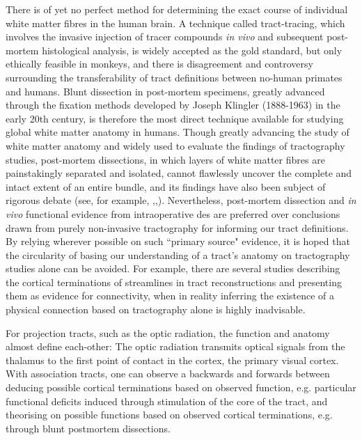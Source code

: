 There is of yet no perfect method for determining the exact course of individual white matter fibres in the human brain.
A technique called tract-tracing, which involves the invasive injection of tracer compounds \textit{in vivo} and subsequent post-mortem histological analysis, is widely accepted as the gold standard, but only ethically feasible in monkeys, and there is disagreement and controversy surrounding the transferability of tract definitions between no-human primates and humans.\autocite{Becker2022,ThiebautdeSchotten2012}
Blunt dissection in post-mortem specimens, greatly advanced through the fixation methods developed by Joseph Klingler (1888-1963) in the early 20th century,\autocite{Agrawal2011} is therefore the most direct technique available for studying global white matter anatomy in humans.
Though greatly advancing the study of white matter anatomy and widely used to evaluate the findings of tractography studies, post-mortem dissections, in which layers of white matter fibres are painstakingly separated and isolated, cannot flawlessly uncover the complete and intact extent of an entire bundle,\autocite{Martino2010, Dick2012} and its findings have also been subject of rigorous debate (see, for example, \textcite{Giampiccolo2022a},\textcite{Becker2022},\textcite{Giampiccolo2022b}).
Nevertheless, post-mortem dissection and \textit{in vivo} functional evidence from intraoperative \gls{des} are preferred over conclusions drawn from purely non-invasive tractography for informing our tract definitions.
By relying wherever possible on such ``primary source" evidence, it is hoped that the circularity of basing our understanding of a tract's anatomy on tractography studies alone can be avoided. %
For example, there are several studies describing the cortical terminations of streamlines in tract reconstructions and presenting them as evidence for connectivity,\autocite{Conner2018,Hau2016} when in reality inferring the existence of a physical connection based on tractography alone is highly inadvisable.\autocite{Rheault2020}

For projection tracts, such as the optic radiation, the function and anatomy almost define each-other:
The optic radiation transmits optical signals from the thalamus to the first point of contact in the cortex, the primary visual cortex.
With association tracts, one can observe a backwards and forwards between deducing possible cortical terminations based on observed function, e.g. particular functional deficits induced through stimulation of the core of the tract, and theorising on possible functions based on observed cortical terminations, e.g. through blunt postmortem dissections.

